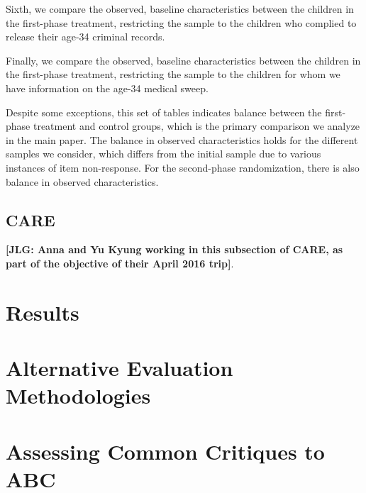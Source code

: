 \begin{appendices}


\noindent Sixth, we compare the observed, baseline characteristics between the children in the first-phase treatment, restricting the sample to the children who complied to release their age-34 criminal records.



\noindent Finally, we compare the observed, baseline characteristics between the children in the first-phase treatment, restricting the sample to the children for whom we have information on the age-34 medical sweep.



\noindent Despite some exceptions, this set of tables indicates balance between the first-phase treatment and control groups, which is the primary comparison we analyze in the main paper. The balance in observed characteristics holds for the different samples we consider, which differs from the initial sample due to various instances of item non-response. For the second-phase randomization, there is also balance in observed characteristics.

\subsection{CARE}

\noindent \textbf{[JLG: Anna and Yu Kyung working in this subsection of CARE, as part of the objective of their April 2016 trip]}.

\setcounter{figure}{0}  \renewcommand{\thefigure}{B.\arabic{figure}}
\setcounter{table}{0}   \renewcommand{\thetable}{B.\arabic{table}}
\section{Results}

\setcounter{figure}{0}  \renewcommand{\thefigure}{C.\arabic{figure}}
\setcounter{table}{0}   \renewcommand{\thetable}{C.\arabic{table}}
\section{Alternative Evaluation Methodologies} \label{appendix:methodology}

\section{Assessing Common Critiques to ABC}


\end{appendices}
